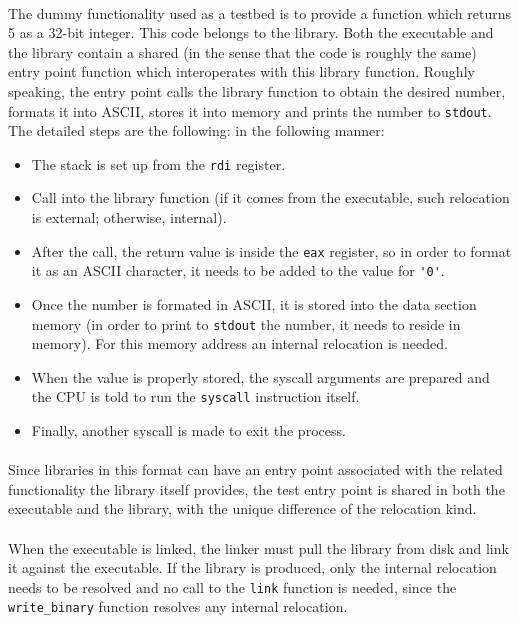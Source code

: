 \documentclass[12pt]{article}
\begin{document}
	\paragraph{}The dummy functionality used as a testbed is to provide a function which returns 5 as a 32-bit integer. This code belongs to the library. Both the executable and the library contain a shared (in the sense that the code is roughly the same) entry point function which interoperates with this library function. Roughly speaking, the entry point calls the library function to obtain the desired number, formats it into ASCII, stores it into memory and prints the number to \verb|stdout|. The detailed steps are the following:
	in the following manner:
	\begin{itemize}
		\item The stack is set up from the \verb|rdi| register.
		\item Call into the library function (if it comes from the executable, such relocation is external; otherwise, internal).
		\item After the call, the return value is inside the \verb|eax| register, so in order to format it as an ASCII character, it needs to be added to the value for \verb|'0'|.
		\item Once the number is formated in ASCII, it is stored into the data section memory (in order to print to \verb|stdout| the number, it needs to reside in memory). For this memory address an internal relocation is needed.
		\item When the value is properly stored, the syscall arguments are prepared and the CPU is told to run the \verb|syscall| instruction itself.
		\item Finally, another syscall is made to exit the process.
	\end{itemize}
	
	\paragraph{}Since libraries in this format can have an entry point associated with the related functionality the library itself provides, the test entry point is shared in both the executable and the library, with the unique difference of the relocation kind.
	\paragraph{}When the executable is linked, the linker must pull the library from disk and link it against the executable. If the library is produced, only the internal relocation needs to be resolved and no call to the \verb|link| function is needed, since the \verb|write_binary| function resolves any internal relocation.
	
\end{document}
